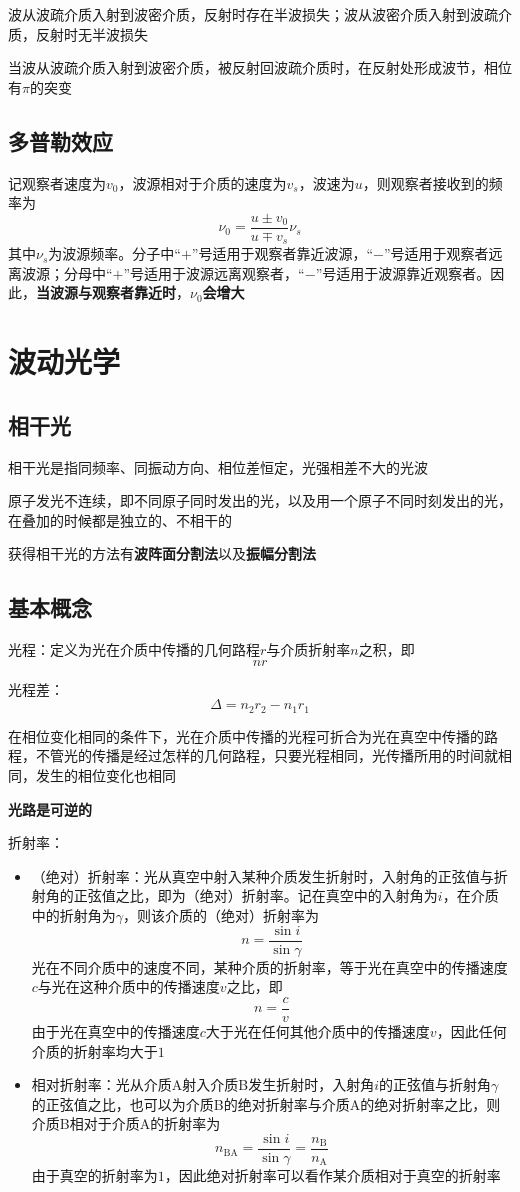 \documentclass[12pt, a4paper, twoside]{ctexbook}
\begin{document}
波从波疏介质入射到波密介质，反射时存在半波损失；波从波密介质入射到波疏介质，反射时无半波损失

当波从波疏介质入射到波密介质，被反射回波疏介质时，在反射处形成波节，相位有$\pi$的突变
\section{多普勒效应}
记观察者速度为$v_0$，波源相对于介质的速度为$v_s$，波速为$u$，则观察者接收到的频率为
$$
\nu_0=\frac{u\pm v_0}{u\mp v_s}\nu_s
$$
其中$\nu_s$为波源频率。分子中“$+$”号适用于观察者靠近波源，“$-$”号适用于观察者远离波源；分母中“$+$”号适用于波源远离观察者，“$-$”号适用于波源靠近观察者。因此，\textbf{当波源与观察者靠近时}，$\nu_0$\textbf{会增大}
\chapter{波动光学}
\newpage
\section{相干光}
相干光是指同频率、同振动方向、相位差恒定，光强相差不大的光波

原子发光不连续，即不同原子同时发出的光，以及用一个原子不同时刻发出的光，在叠加的时候都是独立的、不相干的

获得相干光的方法有\textbf{波阵面分割法}以及\textbf{振幅分割法}
\section{基本概念}
{\sonti 光程}：定义为光在介质中传播的几何路程$r$与介质折射率$n$之积，即
$$
nr
$$

{\sonti 光程差}：
$$
\Delta=n_2r_2-n_1r_1
$$

在相位变化相同的条件下，光在介质中传播的光程可折合为光在真空中传播的路程，不管光的传播是经过怎样的几何路程，只要光程相同，光传播所用的时间就相同，发生的相位变化也相同

\textbf{光路是可逆的}

{\sonti 折射率}：
\begin{itemize}
    \item （绝对）折射率：光从真空中射入某种介质发生折射时，入射角的正弦值与折射角的正弦值之比，即为（绝对）折射率。记在真空中的入射角为$i$，在介质中的折射角为$\gamma$，则该介质的（绝对）折射率为
    $$
    n=\frac{\sin i}{\sin \gamma}
    $$
    光在不同介质中的速度不同，某种介质的折射率，等于光在真空中的传播速度$c$与光在这种介质中的传播速度$v$之比，即
    $$
    n=\frac{c}{v}
    $$
    由于光在真空中的传播速度$c$大于光在任何其他介质中的传播速度$v$，因此任何介质的折射率均大于$1$
    \item 相对折射率：光从介质A射入介质B发生折射时，入射角$i$的正弦值与折射角$\gamma$的正弦值之比，也可以为介质B的绝对折射率与介质A的绝对折射率之比，则介质B相对于介质A的折射率为
    $$
    n_{\mathrm{BA}}=\frac{\sin i}{\sin \gamma}=\frac{n_\mathrm{B}}{n_\mathrm{A}}
    $$
    由于真空的折射率为$1$，因此绝对折射率可以看作某介质相对于真空的折射率
\end{itemize}
\end{document}
